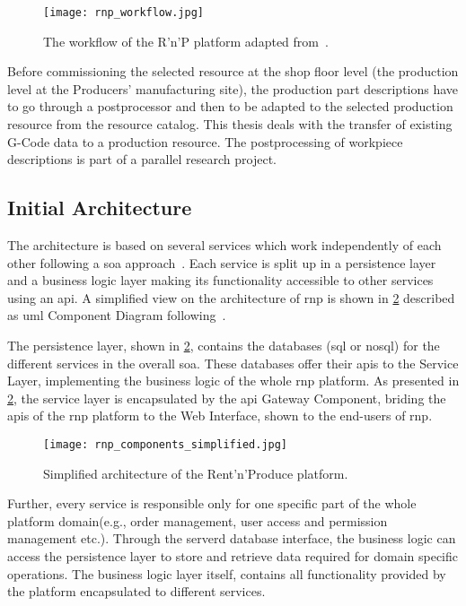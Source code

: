\documentclass[
a4paper,
twoside,
headsepline,
cleardoublepage=empty,
parskip=half,
draft=false
]{scrbook}
\begin{document}
			\begin{figure}[htbp]
				\centering
				\texttt{[image: rnp\_workflow.jpg]}
				\caption{The workflow of the R'n'P platform adapted from~\cite{ellwein2016}.}
				\label{fig:rnp_workflow}
			\end{figure}

			Before commissioning the selected resource at the shop floor level (the production level at the Producers' manufacturing site), the production part descriptions have to go through a postprocessor and then to be adapted to the selected production resource from the resource catalog.
			This thesis deals with the transfer of existing G-Code data to a production resource.
			The postprocessing of workpiece descriptions is part of a parallel research project.

			\subsection{Initial Architecture}\label{subsec:initial_architecture}

			The architecture is based on several services which work independently of each other following a \gls{soa} approach~\cite{erl2008soa}.
			Each service is split up in a persistence layer and a business logic layer making its functionality accessible to other services using an \gls{api}.
			A simplified view on the architecture of \gls{rnp} is shown in \cref{fig:rnp_architecture} described as \gls{uml} Component Diagram following~\cite{uml2017}.
			
			The persistence layer, shown in \cref{fig:rnp_architecture}, contains the databases (\gls{sql} or \gls{nosql}) for the different services in the overall \gls{soa}. These databases offer their \gls{api}s to the Service Layer, implementing the business logic of the whole \gls{rnp} platform. As presented in \cref{fig:rnp_architecture}, the service layer is encapsulated by the \gls{api} Gateway Component, briding the \gls{api}s of the \gls{rnp} platform to the Web Interface, shown to the end-users of \gls{rnp}.

			\begin{figure}[htbp]
				\centering
				\texttt{[image: rnp\_components\_simplified.jpg]}
				\caption{Simplified architecture of the Rent'n'Produce platform.}
				\label{fig:rnp_architecture}
			\end{figure}

			Further, every service is responsible only for one specific part of the whole platform domain(e.g., order management, user access and permission management etc.).
			Through the serverd database interface, the business logic can access the persistence layer to store and retrieve data required for domain specific operations.
			The business logic layer itself, contains all functionality provided by the platform encapsulated to different services.
\end{document}
